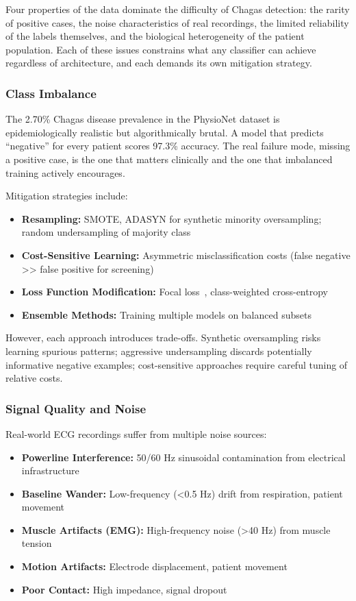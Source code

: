 Four properties of the data dominate the difficulty of Chagas detection: the rarity of positive cases, the noise characteristics of real recordings, the limited reliability of the labels themselves, and the biological heterogeneity of the patient population. Each of these issues constrains what any classifier can achieve regardless of architecture, and each demands its own mitigation strategy.

\subsubsection{Class Imbalance}

The 2.70\% Chagas disease prevalence in the PhysioNet dataset is epidemiologically realistic but algorithmically brutal. A model that predicts ``negative'' for every patient scores 97.3\% accuracy. The real failure mode, missing a positive case, is the one that matters clinically and the one that imbalanced training actively encourages.

Mitigation strategies include:
\begin{itemize}
    \item \textbf{Resampling:} SMOTE, ADASYN for synthetic minority oversampling; random undersampling of majority class
    \item \textbf{Cost-Sensitive Learning:} Asymmetric misclassification costs (false negative >> false positive for screening)
    \item \textbf{Loss Function Modification:} Focal loss~\cite{lin2017focal}, class-weighted cross-entropy
    \item \textbf{Ensemble Methods:} Training multiple models on balanced subsets
\end{itemize}

However, each approach introduces trade-offs. Synthetic oversampling risks learning spurious patterns; aggressive undersampling discards potentially informative negative examples; cost-sensitive approaches require careful tuning of relative costs.

\subsubsection{Signal Quality and Noise}

Real-world ECG recordings suffer from multiple noise sources:

\begin{itemize}
    \item \textbf{Powerline Interference:} 50/60 Hz sinusoidal contamination from electrical infrastructure
    \item \textbf{Baseline Wander:} Low-frequency (<0.5 Hz) drift from respiration, patient movement
    \item \textbf{Muscle Artifacts (EMG):} High-frequency noise (>40 Hz) from muscle tension
    \item \textbf{Motion Artifacts:} Electrode displacement, patient movement
    \item \textbf{Poor Contact:} High impedance, signal dropout
\end{itemize}

